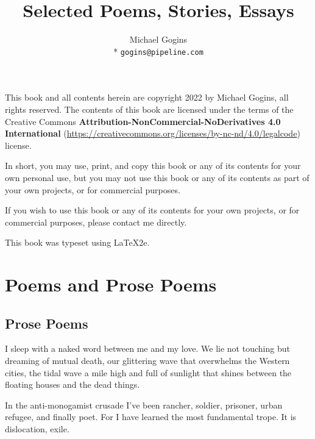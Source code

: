 \documentclass[english,11pt,letterpaper,onecolumn]{scrbook}
\begin{document}
\frontmatter

\title{Selected Poems, Stories, Essays}
\author{Michael Gogins \\* \texttt{gogins@pipeline.com}}
\maketitle
\newpage

This book and all contents herein are copyright 2022 by Michael Gogins, all rights reserved. The contents of this book are licensed under the terms of the Creative Commons \textbf{Attribution-NonCommercial-NoDerivatives 4.0 International} (\url{https://creativecommons.org/licenses/by-nc-nd/4.0/legalcode}) license. 

In short, you may use, print, and copy this book or any of its contents for your own personal use, but you may not use this book or any of its contents as part of your own projects, or for commercial purposes.

If you wish to use this book or any of its contents for your own projects, or for commercial purposes, please contact me directly.

This book was typeset using LaTeX2e.

\tableofcontents
\mainmatter
\pagestyle{scrheadings}
\cfoot{}
\lefoot{}
\lofoot{\pagemark}
\rofoot{}

\part{Poems and Prose Poems}

\chapter{Prose Poems}


	I sleep with a naked word between me and my love.  We lie not touching but dreaming of mutual death, our glittering wave that overwhelms the Western cities, the tidal wave a mile high and full of sunlight that shines between the floating houses and the dead things.



\newpage
{}

	In the anti-monogamist crusade I've been rancher, soldier, prisoner, urban refugee, and finally poet.  For I have learned the most fundamental trope.  It is dislocation, exile.
\end{document}
